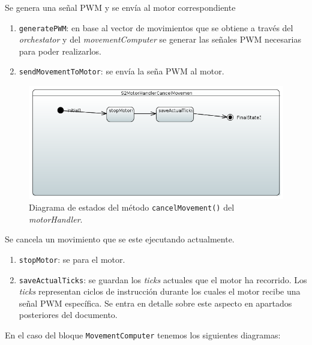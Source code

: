 Se genera una señal PWM y se envía al motor correspondiente

\begin{enumerate}
    \item \texttt{generatePWM}: en base al vector de movimientos que se obtiene a través del \textit{orchestator} y del \textit{movementComputer} se generar las señales PWM necesarias para poder realizarlos.
    
    \item \texttt{sendMovementToMotor}: se envía la seña \ac{PWM} al motor.
\end{enumerate}

\begin{figure}[H]
    \centering
    \includegraphics[width=1\linewidth]{pictures/S2MotorHandlerCancelMovement.PNG}
    \caption{Diagrama de estados del método \texttt{cancelMovement()} del \textit{motorHandler}.}
    \label{fig:fun_cancel_movement_motor_handler}
\end{figure}

Se cancela un movimiento que se este ejecutando actualmente.

\begin{enumerate}
    \item \texttt{stopMotor}: se para el motor.
    \item \texttt{saveActualTicks}: se guardan los \textit{ticks} actuales que el motor ha recorrido. Los \textit{ticks} representan ciclos de instrucción durante los cuales el motor recibe una señal \ac{PWM} específica. Se entra en detalle sobre este aspecto en apartados posteriores del documento.
\end{enumerate}

En el caso del bloque \texttt{MovementComputer} tenemos los siguientes diagramas:

